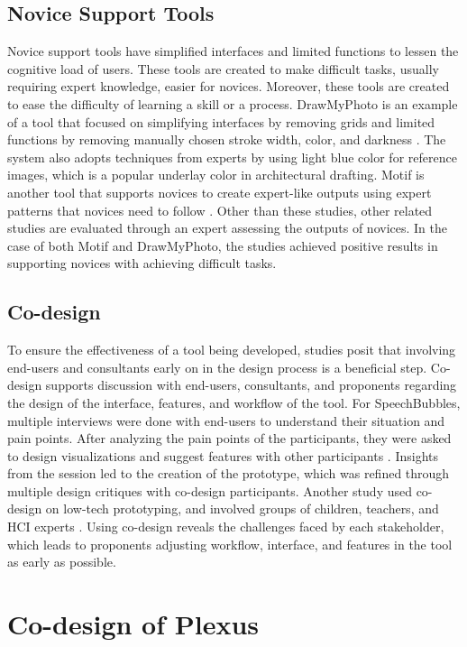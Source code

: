 \documentclass{sigchi}
\begin{document}
\subsection{Novice Support Tools}
Novice support tools have simplified interfaces and limited functions to lessen the cognitive load of users. These tools are created to make difficult tasks, usually requiring expert knowledge, easier for novices. Moreover, these  tools are created to ease the difficulty of learning a skill or a process. DrawMyPhoto is an example of a tool that focused on simplifying interfaces by removing grids and limited functions by removing manually chosen stroke width, color, and darkness \cite{Williford2019}. The system also adopts techniques from experts by using light blue color for reference images, which is a popular underlay color in architectural drafting. Motif is another tool that supports novices to create expert-like outputs using expert patterns that novices need to follow \cite{Kim2015}. Other than these studies, other related studies are evaluated through an expert assessing the outputs of novices. In the case of both Motif and DrawMyPhoto, the studies achieved positive results in supporting novices with achieving difficult tasks.  
\subsection{Co-design}
To ensure the effectiveness of a tool being developed, studies posit that involving end-users and consultants early on in the design process is a beneficial step. Co-design supports discussion with end-users, consultants, and  proponents regarding the design of the interface, features, and workflow of the tool. For SpeechBubbles, multiple interviews were done with end-users to understand their situation and pain points. After analyzing the pain points of the participants, they were asked to design visualizations and suggest features with other participants \cite{Peng2018}. Insights from the session led to the creation of the prototype, which was refined through multiple design critiques with co-design participants. Another study used co-design on low-tech prototyping, and involved groups of children, teachers, and HCI experts \cite{Alhumaidan2015}. Using co-design reveals the challenges faced by each stakeholder, which leads to proponents adjusting workflow, interface, and features in the tool as early as possible. 

\section{Co-design of Plexus}
\end{document}
